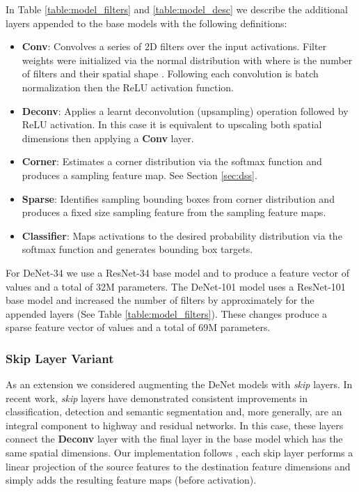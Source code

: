 \documentclass[10pt,twocolumn]{article}
\begin{document}
In Table \ref{table:model_filters} and \ref{table:model_desc} we describe the additional layers appended to the base models with the following definitions:
\begin{itemize}
\item \textbf{Conv}: Convolves a series of 2D filters over the input activations. Filter weights were initialized via the normal distribution  with  where  is the number of filters and  their spatial shape \cite{init}. Following each convolution is batch normalization \cite{batchnorm} then the ReLU activation function.
\item \textbf{Deconv}: Applies a learnt deconvolution\cite{deconv} (upsampling) operation followed by ReLU activation. In this case it is equivalent to upscaling both spatial dimensions then applying a \textbf{Conv} layer. 
\item \textbf{Corner}: Estimates a corner distribution via the softmax function and produces a sampling feature map. See Section \ref{sec:dss}.
\item \textbf{Sparse}: Identifies sampling bounding boxes from corner distribution and produces a fixed size sampling feature from the sampling feature maps. \item \textbf{Classifier}: Maps activations to the desired probability distribution via the softmax function and generates bounding box targets.
\end{itemize}

For DeNet-34 we use a ResNet-34 base model and  to produce a feature vector of  values and a total of 32M parameters. The DeNet-101 model uses a ResNet-101 base model and increased the number of filters by approximately  for the appended layers (See Table \ref{table:model_filters}). These changes produce a sparse feature vector of  values and a total of 69M parameters.

\subsubsection{Skip Layer Variant}

As an extension we considered augmenting the DeNet models with \textit{skip} layers. In recent work, \textit{skip} layers have demonstrated consistent improvements in classification\cite{resnet}, detection\cite{fpn} and semantic segmentation\cite{semanticskip} and, more generally, are an integral component to highway \cite{highway} and residual networks\cite{resnet}. In this case, these layers connect the \textbf{Deconv} layer with the final layer in the base model which has the same spatial dimensions. Our implementation follows \cite{fpn}, each skip layer performs a linear projection of the source features to the destination feature dimensions and simply adds the resulting feature maps (before activation). 
 
\end{document}
